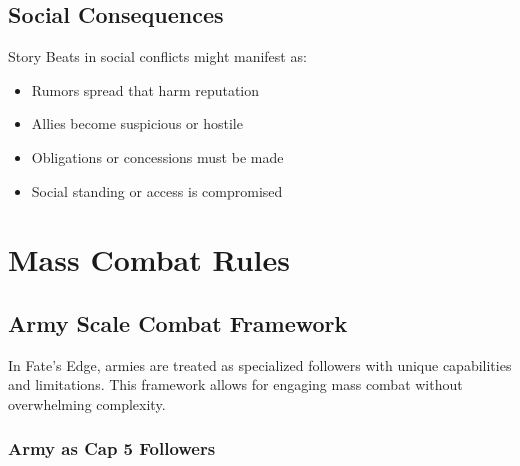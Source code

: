\subsection{Social Consequences}
Story Beats in social conflicts might manifest as:
\begin{itemize}
\item Rumors spread that harm reputation
\item Allies become suspicious or hostile
\item Obligations or concessions must be made
\item Social standing or access is compromised
\end{itemize}

\section{Mass Combat Rules}

\subsection{Army Scale Combat Framework}

In Fate's Edge, armies are treated as specialized followers with unique capabilities and limitations. This framework allows for engaging mass combat without overwhelming complexity.

\subsubsection{Army as Cap 5 Followers}

